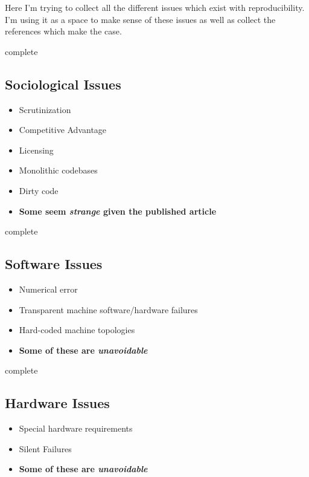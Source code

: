 \documentclass[american]{article}
\newcommand{\complete}{
	\gls{complete}
}
\begin{document}
Here I'm trying to collect all the different issues which exist with reproducibility. I'm using it as a space to make sense of these issues as well as collect the references which make the case.

\complete

\subsection{Sociological Issues} \label{sec:repro-sociological-issues}

\begin{itemize}
\item Scrutinization
\item Competitive Advantage
\item Licensing
\item Monolithic codebases
\item Dirty code
\item \textbf{Some seem \textit{strange} given the published article}
\end{itemize}

\complete

\subsection{Software Issues} \label{sec:repro-software-issues}

\begin{itemize}
\item Numerical error
\item Transparent machine software/hardware failures
\item Hard-coded machine topologies
\item \textbf{Some of these are \textit{unavoidable}}
\end{itemize}

\complete

\subsection{Hardware Issues} \label{sec:repro-hardware-issues}

\begin{itemize}
\item Special hardware requirements
\item Silent Failures
\item \textbf{Some of these are \textit{unavoidable}}
\end{itemize}
\end{document}
